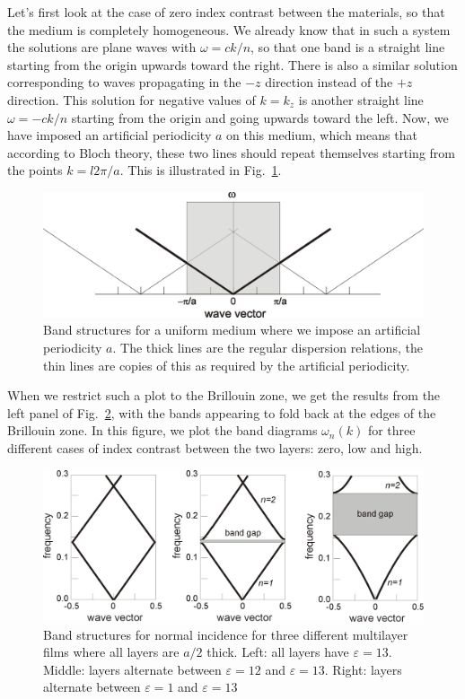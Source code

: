 Let's first look at the case of zero index contrast between the materials, so that the medium is completely homogeneous. We already know that in such a system the solutions are plane waves with $\omega = c k / n$, so that one band is a straight line starting from the origin upwards toward the right. There is also a similar solution corresponding to waves propagating in the $-z$ direction instead of the $+z$ direction. This solution for negative values of $k=k_z$ is another straight line $\omega = - c k / n$ starting from the origin and going upwards toward the left. Now, we have imposed an artificial periodicity $a$ on this medium, which means that according to Bloch theory, these two lines should repeat themselves starting from the points $k = l 2 \pi / a$. This is illustrated in Fig.~\ref{fig-1d-bands-uniform}.

\begin{figure}
\centering
\includegraphics{symmetry/figures/band_folding_uniform}
\caption{Band structures for a uniform medium where we impose an artificial periodicity $a$. The thick lines are the regular dispersion relations, the thin lines are copies of this as required by the artificial periodicity.}
\label{fig-1d-bands-uniform}
\end{figure}

When we restrict such a plot to the Brillouin zone, we get the results from the left panel of Fig.~\ref{fig-1d-bands}, with the bands appearing to fold back at the edges of the Brillouin zone. In this figure, we plot the band diagrams $\omega_n(k)$ for three different cases of index contrast between the two layers: zero, low and high.

\begin{figure}
\centering
\includegraphics{symmetry/figures/1D_bands}
\caption{Band structures for normal incidence for three different multilayer films where all layers are $a/2$ thick. Left: all layers have $\varepsilon=13$. Middle: layers alternate between $\varepsilon=12$ and $\varepsilon=13$. Right: layers alternate between $\varepsilon=1$ and $\varepsilon=13$}
\label{fig-1d-bands}
\end{figure}

